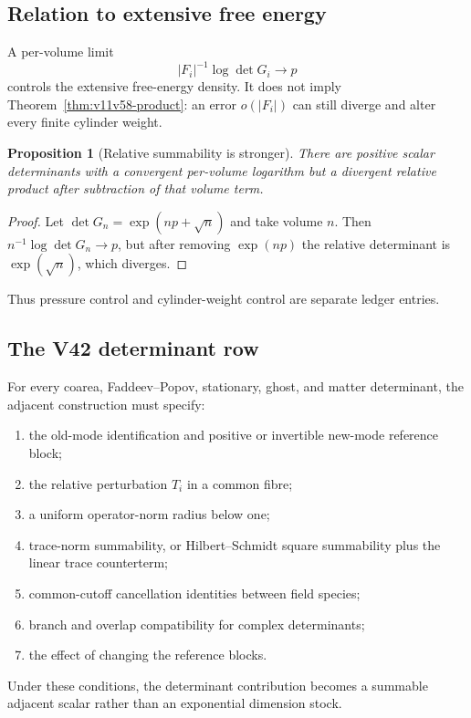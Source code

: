 \documentclass[11pt]{article}
\newtheorem{proposition}[theorem]{Proposition}
\begin{document}
\subsection{Relation to extensive free energy}

A per-volume limit
\[
                   |F_i|^{-1}\log\det G_i\longrightarrow p   \tag{58.21}
\]
controls the extensive free-energy density.  It does not imply
Theorem~\ref{thm:v11v58-product}: an error \(o(|F_i|)\) can still
diverge and alter every finite cylinder weight.

\begin{proposition}[Relative summability is stronger]
\label{prop:v11v58-stronger}
There are positive scalar determinants with a convergent per-volume
logarithm but a divergent relative product after subtraction of that
volume term.
\end{proposition}

\begin{proof}
Let \(\det G_n=\exp(np+\sqrt n)\) and take volume \(n\).
Then \(n^{-1}\log\det G_n\to p\), but after removing \(\exp(np)\) the
relative determinant is \(\exp(\sqrt n)\), which diverges.
\end{proof}

Thus pressure control and cylinder-weight control are separate ledger
entries.

\subsection{The V42 determinant row}

\begin{ledger}
\label{led:v11v58-acquisition}
For every coarea, Faddeev--Popov, stationary, ghost, and matter
determinant, the adjacent construction must specify:
\begin{enumerate}
\item the old-mode identification and positive or invertible new-mode
reference block;
\item the relative perturbation \(T_i\) in a common fibre;
\item a uniform operator-norm radius below one;
\item trace-norm summability, or Hilbert--Schmidt square summability
plus the linear trace counterterm;
\item common-cutoff cancellation identities between field species;
\item branch and overlap compatibility for complex determinants;
\item the effect of changing the reference blocks.
\end{enumerate}
Under these conditions, the determinant contribution becomes a
summable adjacent scalar rather than an exponential dimension stock.
\end{ledger}
\end{document}
